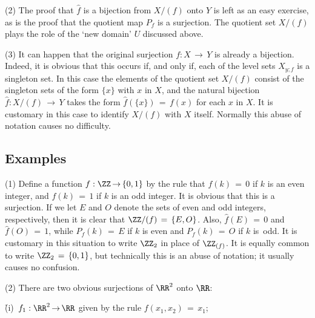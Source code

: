 {\V
        (2) The proof that $\hat{f}$ is a bijection from $X/(f)$ onto $Y$ is left as an easy exercise,
    as is the proof that the quotient map $P_{f}$ is a surjection. The quotient set $X/(f)$ plays the role of the `new domain' $U$ discussed above.


\V

        (3) It can happen that the original surjection $f:X \,{\rightarrow}\, Y$ is already a bijection.
    Indeed, it is obvious that this occurs if, and only if, each of the level sets $X_{y;f}$ is a singleton set.
    In this case the elements of the quotient set $X/(f)$ consist of the singleton sets of the form $\{x\}$ with $x$ in $X$,
    and the natural bijection $\hat{f}:X/(f) \,{\rightarrow}\, Y$ takes the form $\hat{f}(\{x\}) \,=\, f(x)$ for each $x$ in $X$.
    It is customary in this case to identify $X/(f)$ with $X$ itself. Normally this abuse of notation causes no difficulty.


\VV

        \subsection{\small{{\bf Examples}}}
        \label{ExampA50.70}

\hspace*{\parindent}
        (1) Define a function $f:{\ZZ} \,{\rightarrow}\, \{0,1\}$ by the rule that $f(k) \,=\, 0$ if $k$ is an even integer,
    and $f(k) \,=\, 1$ if $k$ is an odd integer. It is obvious that this is a surjection.
    If we let $E$ and $O$ denote the sets of even and odd integers, respectively, then it is clear that ${\ZZ}/(f) \,=\, \{E,O\}$.
    Also, $\hat{f}(E) \,=\, 0$ and $\hat{f}(O) \,=\, 1$, while $P_{f}(k) \,=\, E$ if $k$ is even and $P_{f}(k) \,=\, O$ if $k$ is~odd.
    It is customary in this situation to write ${\ZZ}_{2}$ in place of ${\ZZ}_{(f)}$.
    It is equally common to write ${\ZZ}_{2} \,=\, \{0,1\}$, but technically this is an abuse of notation; it usually causes no confusion.

\V

        (2) There are two obvious surjections of ${\RR}^{2}$ onto ${\RR}$:

\VA

        \h (i)\, $f_{1}:{\RR}^{2} \,{\rightarrow}\, {\RR}$ given by the rule $f(x_{1},x_{2}) \,=\, x_{1}$;

}
